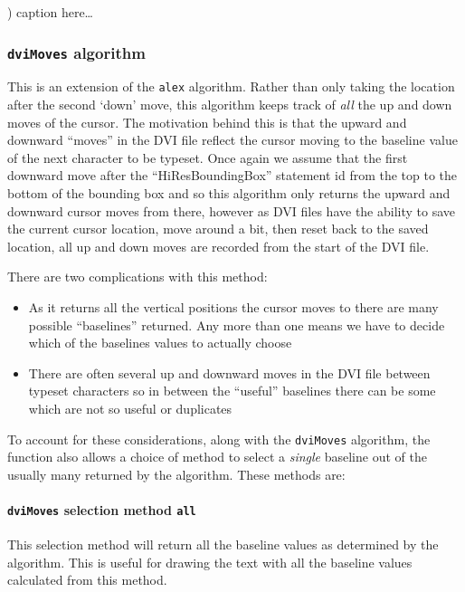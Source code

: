 \documentclass[]{article}
\let\oldparagraph\paragraph
\renewcommand{\paragraph}[1]{\oldparagraph{#1}\mbox{}}
\begin{document}
) caption here\ldots{}

\subsubsection{\texorpdfstring{\texttt{dviMoves}
algorithm}{dviMoves algorithm}}\label{dvimoves-algorithm}

This is an extension of the \texttt{alex} algorithm. Rather than only
taking the location after the second `down' move, this algorithm keeps
track of \emph{all} the up and down moves of the cursor. The motivation
behind this is that the upward and downward ``moves'' in the DVI file
reflect the cursor moving to the baseline value of the next character to
be typeset. Once again we assume that the first downward move after the
``HiResBoundingBox'' statement id from the top to the bottom of the
bounding box and so this algorithm only returns the upward and downward
cursor moves from there, however as DVI files have the ability to save
the current cursor location, move around a bit, then reset back to the
saved location, all up and down moves are recorded from the start of the
DVI file.

There are two complications with this method:

\begin{itemize}
\item
  As it returns all the vertical positions the cursor moves to there are
  many possible ``baselines'' returned. Any more than one means we have
  to decide which of the baselines values to actually choose
\item
  There are often several up and downward moves in the DVI file between
  typeset characters so in between the ``useful'' baselines there can be
  some which are not so useful or duplicates
\end{itemize}

To account for these considerations, along with the \texttt{dviMoves}
algorithm, the function also allows a choice of method to select a
\emph{single} baseline out of the usually many returned by the
algorithm. These methods are:

\paragraph{\texorpdfstring{\texttt{dviMoves} selection method
\texttt{all}}{dviMoves selection method all}}\label{dvimoves-selection-method-all}

This selection method will return all the baseline values as determined
by the algorithm. This is useful for drawing the text with all the
baseline values calculated from this method.
\end{document}
